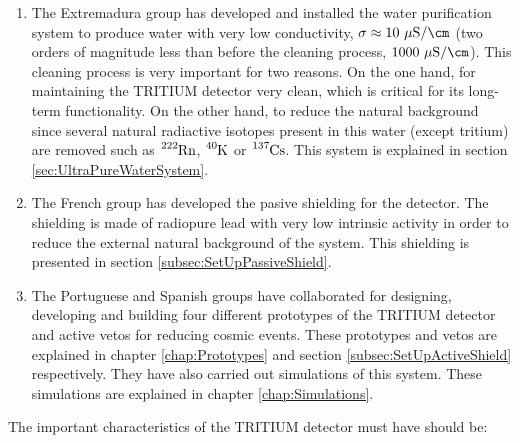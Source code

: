 \begin{enumerate}
\item{} The Extremadura group has developed and installed the water purification system to produce water with very low conductivity, $\sigma \approx 10~\mu\text{S}/\cm$ (two orders of magnitude less than before the cleaning process, $1000~\mu\text{S}/\cm$). This cleaning process is very important for two reasons. On the one hand, for maintaining the TRITIUM detector very clean, which is critical for its long-term functionality. On the other hand, to reduce the natural background since several natural radiactive isotopes present in this water (except tritium) are removed such as $\ce{^{222}Rn}$, $\ce{^{40}K}$ or $\ce{^{137}Cs}$. This system is explained in section \ref{sec:UltraPureWaterSystem}.

\item{} The French group has developed the pasive shielding for the detector. The shielding is made of radiopure lead with very low intrinsic activity in order to reduce the external natural background of the system. This shielding is presented in section \ref{subsec:SetUpPassiveShield}.

\item{} The Portuguese and Spanish groups have collaborated for designing, developing and building four different prototypes of the TRITIUM detector and active vetos for reducing cosmic events. These prototypes and vetos are explained in chapter \ref{chap:Prototypes} and section \ref{subsec:SetUpActiveShield} respectively. They have also carried out simulations of this system. These simulations are explained in chapter \ref{chap:Simulations}.

\end{enumerate}

The important characteristics of the TRITIUM detector must have should be:

